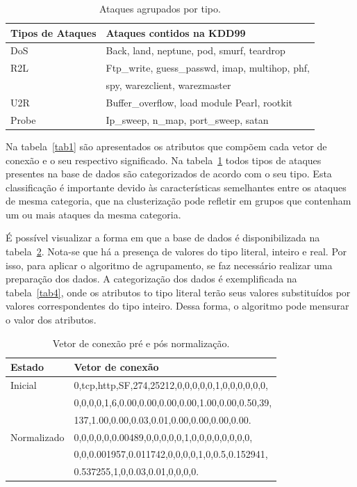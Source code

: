 \begin{table}[h!]
\centering
\caption{Ataques agrupados por tipo.}
\vspace{0.5cm}
\begin{tabular}{|l|l|}
\hline
\textbf{Tipos de Ataques} & \textbf{Ataques contidos na KDD99}\\
\hline
DoS &	Back, land, neptune, pod, smurf, teardrop \\
\hline
R2L &	Ftp\_write, guess\_passwd, imap, multihop, phf,\\ & spy, warezclient, warezmaster \\
\hline
U2R &	Buffer\_overflow, load module Pearl, rootkit\\
\hline
Probe &	Ip\_sweep, n\_map, port\_sweep, satan\\
\hline
\end{tabular}
\label{tab2}
\end{table}

\indent Na tabela~\ref{tab1} são apresentados os atributos que compõem cada vetor de conexão e o seu respectivo significado. Na tabela~\ref{tab2} todos tipos de ataques presentes na base de dados são categorizados de acordo com o seu tipo. Esta classificação é importante devido às características semelhantes entre os ataques de mesma categoria, que na clusterização pode refletir em grupos que contenham um ou mais ataques da mesma categoria.

\indent É possível visualizar a forma em que a base de dados é disponibilizada na tabela~\ref{tab3}. Nota-se que há a presença de valores do tipo literal, inteiro e real. Por isso, para aplicar o algoritmo de agrupamento, se faz necessário realizar uma preparação dos dados. A categorização dos dados é exemplificada na tabela~\ref{tab4}, onde os atributos to tipo literal terão seus valores substituídos por valores correspondentes do tipo inteiro. Dessa forma, o algoritmo pode mensurar o valor dos atributos.

\begin{table}[h]
\centering
\caption{Vetor de conexão pré e pós normalização.}
\vspace{0.5cm}
\begin{tabular}{|l|l|}
\hline
\textbf{Estado} & \textbf{Vetor de conexão}\\
\hline
Inicial	 & 0,tcp,http,SF,274,25212,0,0,0,0,0,1,0,0,0,0,0,0,
	\\ & 0,0,0,0,1,6,0.00,0.00,0.00,0.00,1.00,0.00,0.50,39,
	\\ & 137,1.00,0.00,0.03,0.01,0.00,0.00,0.00,0.00.\\
\hline
Normalizado & 0,0,0,0,0,0.00489,0,0,0,0,0,1,0,0,0,0,0,0,0,0,
	   \\& 0,0,0.001957,0.011742,0,0,0,0,1,0,0.5,0.152941,
	   \\& 0.537255,1,0,0.03,0.01,0,0,0,0.\\
\hline

\end{tabular}
\label{tab3}
\end{table}

